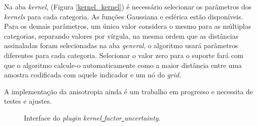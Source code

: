Na aba \textit{kernel}, (Figura \autoref{kernel_kernel}) é necessário selecionar os parâmetros dos \textit{kernels} para cada categoria. As funções Gaussiana e esférica estão disponíveis. Para os demais parâmetros, um único valor considera o mesmo para as múltiplas categorias, separando valores por vírgula, na mesma ordem que as distâncias assinaladas foram selecionadas na aba \textit{general}, o algoritmo usará parâmetros diferentes para cada categoria. Selecionar o valor zero para o suporte fará com que o algoritmo calcule-o automaticamente como a maior distância entre uma amostra codificada com aquele indicador e um nó do \textit{grid}.

A implementação da anisotropia ainda é um trabalho em progresso e necessita de testes e ajustes.

\begin{figure}[H] 
    \centering
    \caption{Interface do \textit{plugin} \textit{kernel\underline{ }factor\underline{ }uncertainty}.} \label{kernel_plug}
     \hspace{1em}
\end{figure}

